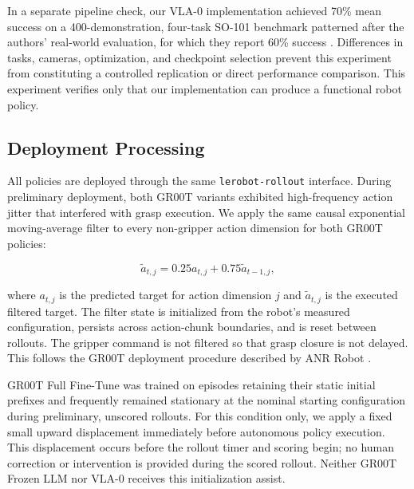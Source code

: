 \documentclass[conference]{IEEEtran}
\begin{document}
In a separate pipeline check, our VLA-0 implementation achieved 70\% mean success on a 400-demonstration, four-task SO-101 benchmark patterned after the authors' real-world evaluation, for which they report 60\% success \cite{goyal2025vla0}. Differences in tasks, cameras, optimization, and checkpoint selection prevent this experiment from constituting a controlled replication or direct performance comparison. This experiment verifies only that our implementation can produce a functional robot policy.

\subsection{Deployment Processing}

All policies are deployed through the same \texttt{lerobot-rollout} interface. During preliminary deployment, both GR00T variants exhibited high-frequency action jitter that interfered with grasp execution. We apply the same causal exponential moving-average filter to every non-gripper action dimension for both GR00T policies:

\begin{equation}
    \widetilde{a}_{t,j}
    =
    0.25a_{t,j}
    +
    0.75\widetilde{a}_{t-1,j},
    \label{eq:groot_ema}
\end{equation}

where $a_{t,j}$ is the predicted target for action dimension $j$ and $\widetilde{a}_{t,j}$ is the executed filtered target. The filter state is initialized from the robot's measured configuration, persists across action-chunk boundaries, and is reset between rollouts. The gripper command is not filtered so that grasp closure is not delayed. This follows the GR00T deployment procedure described by ANR Robot \cite{anr_gr00t_experiments}.

GR00T Full Fine-Tune was trained on episodes retaining their static initial prefixes and frequently remained stationary at the nominal starting configuration during preliminary, unscored rollouts. For this condition only, we apply a fixed small upward displacement immediately before autonomous policy execution. This displacement occurs before the rollout timer and scoring begin; no human correction or intervention is provided during the scored rollout. Neither GR00T Frozen LLM nor VLA-0 receives this initialization assist.

\end{document}

